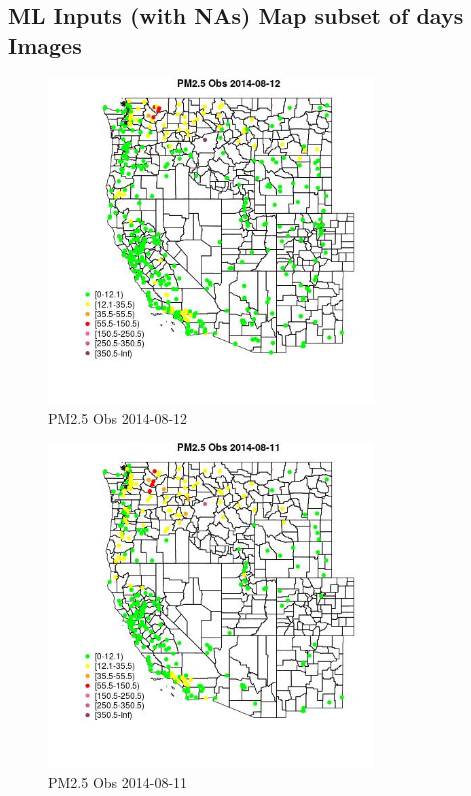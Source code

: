
\subsection{ML Inputs (with NAs) Map subset of days Images} 
 

\begin{figure} 
\centering  
\includegraphics[width=0.77\textwidth]{Code_Outputs/Report_ML_input_PM25_Step4_part_e_de_duplicated_aveswNAs_MapObsPM25_Obs2014-08-12.jpg} 
\caption{\label{fig:Report_ML_input_PM25_Step4_part_e_de_duplicated_aveswNAsMapObsPM25_Obs2014-08-12}PM2.5 Obs 2014-08-12} 
\end{figure} 
 

\begin{figure} 
\centering  
\includegraphics[width=0.77\textwidth]{Code_Outputs/Report_ML_input_PM25_Step4_part_e_de_duplicated_aveswNAs_MapObsPM25_Obs2014-08-11.jpg} 
\caption{\label{fig:Report_ML_input_PM25_Step4_part_e_de_duplicated_aveswNAsMapObsPM25_Obs2014-08-11}PM2.5 Obs 2014-08-11} 
\end{figure} 
 

